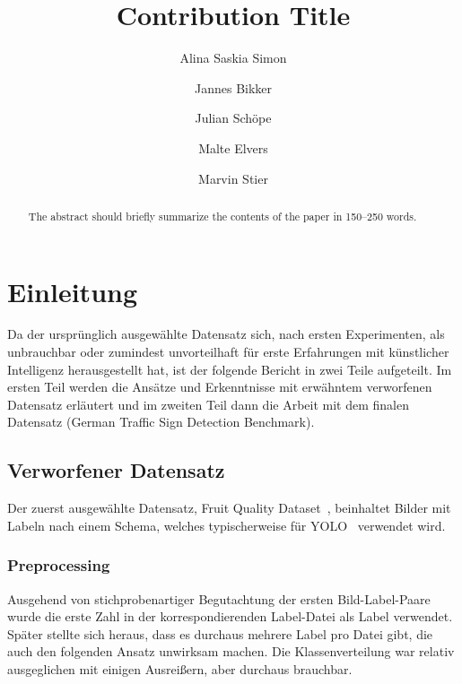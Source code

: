 \documentclass[runningheads]{llncs}
\begin{document}
%
\title{Contribution Title}
%
%
\author{Alina Saskia Simon \and
Jannes Bikker \and
Julian Schöpe \and
Malte Elvers \and
Marvin Stier}
%
%
%
\maketitle              %
%
\begin{abstract}
The abstract should briefly summarize the contents of the paper in
150--250 words.

\end{abstract}
%
%
%
\section{Einleitung}
Da der ursprünglich ausgewählte Datensatz sich, nach ersten Experimenten, als unbrauchbar oder zumindest unvorteilhaft für erste Erfahrungen mit künstlicher Intelligenz herausgestellt hat, ist der folgende Bericht in zwei Teile aufgeteilt. Im ersten Teil werden die Ansätze und Erkenntnisse mit erwähntem verworfenen Datensatz erläutert und im zweiten Teil dann die Arbeit mit dem finalen Datensatz (German Traffic Sign Detection Benchmark).

\subsection{Verworfener Datensatz}
Der zuerst ausgewählte Datensatz, Fruit Quality Dataset~\cite{ref_fruit_dataset}, beinhaltet Bilder mit Labeln nach einem Schema, welches typischerweise für YOLO~\cite{ref_yolo} verwendet wird.

\subsubsection{Preprocessing} Ausgehend von stichprobenartiger Begutachtung der ersten Bild-Label-Paare wurde die erste Zahl in der korrespondierenden Label-Datei als Label verwendet. Später stellte sich heraus, dass es durchaus mehrere Label pro Datei gibt, die auch den folgenden Ansatz unwirksam machen. Die Klassenverteilung war relativ ausgeglichen mit einigen Ausreißern, aber durchaus brauchbar.
\end{document}
